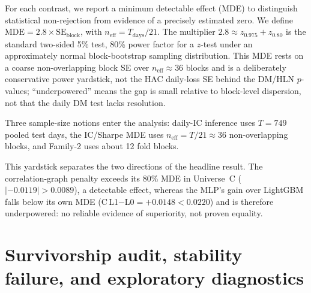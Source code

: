 \documentclass{article}
\begin{document}
For each contrast, we report a minimum detectable effect (MDE) to distinguish
statistical non-rejection from evidence of a precisely estimated zero. We define
$\text{MDE}=2.8\times\text{SE}_{\text{block}}$, with
$n_{\text{eff}}=T_{\text{days}}/21$. The multiplier
$2.8\approx z_{0.975}+z_{0.80}$ is the standard two-sided 5\% test, 80\% power
factor for a $z$-test under an approximately normal block-bootstrap sampling
distribution. This MDE rests on a coarse non-overlapping block SE over
$n_{\text{eff}}\approx36$ blocks and is a deliberately conservative power
yardstick, not the HAC daily-loss SE behind the DM/HLN $p$-values;
``underpowered'' means the gap is small relative to block-level dispersion, not
that the daily DM test lacks resolution.

Three sample-size notions enter the analysis: daily-IC inference uses $T=749$
pooled test days, the IC/Sharpe MDE uses $n_{\text{eff}}=T/21\approx36$
non-overlapping blocks, and Family-2 uses about 12 fold blocks.

This yardstick separates the two directions of the headline result. The
correlation-graph penalty exceeds its 80\% MDE in Universe~C
($|{-0.0119}|>0.0089$), a detectable effect, whereas the MLP's gain over
LightGBM falls below its own MDE (C\,L1$-$L0${}=+0.0148<0.0220$) and is
therefore underpowered: no reliable evidence of superiority, not proven
equality.


\section{Survivorship audit, stability failure, and exploratory diagnostics}\label{app:diag}
\end{document}
